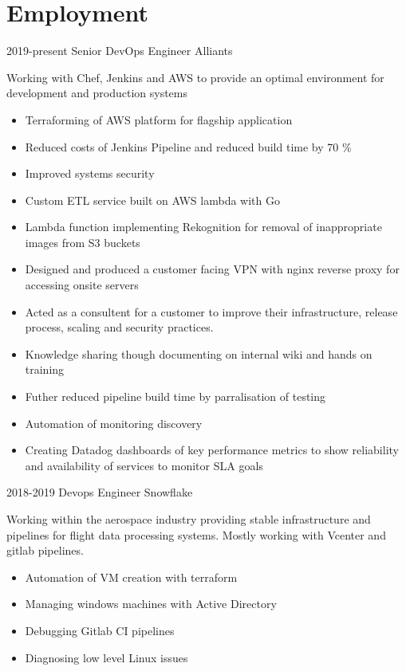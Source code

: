\documentclass[]{friggeri-cv-a4}
\begin{document}
\section{Employment}
 \begin{entrylist}
  \entry
  	{2019-present}
  	{Senior DevOps Engineer}
  	{Alliants}
  	{Working with Chef, Jenkins and AWS to provide an optimal environment for development and production systems
      \begin{itemize}
        \item Terraforming of AWS platform for flagship application
        \item Reduced costs of Jenkins Pipeline and reduced build time by 70 \%
        \item Improved systems security
        \item Custom ETL service built on AWS lambda with Go
        \item Lambda function implementing Rekognition for removal of inappropriate images from S3 buckets
        \item Designed and produced a customer facing VPN with nginx reverse proxy for accessing onsite servers
        \item Acted as a consultent for a customer to improve their infrastructure, release process, scaling and security practices. 
        \item Knowledge sharing though documenting on internal wiki and hands on training
        \item Futher reduced pipeline build time by parralisation of testing
        \item Automation of monitoring discovery
        \item Creating Datadog dashboards of key performance metrics to show reliability and availability of services to monitor SLA goals
      \end{itemize}}
  \entry 
  	{2018-2019}
  	{Devops Engineer}
  	{Snowflake}
  	{
      Working within the aerospace industry providing stable infrastructure and pipelines for flight data processing systems. Mostly working with Vcenter and gitlab pipelines.
      \begin{itemize}
        \item Automation of VM creation with terraform
        \item Managing windows machines with Active Directory
        \item Debugging Gitlab CI pipelines
        \item Diagnosing low level Linux issues

\end{itemize}}
\end{entrylist}
\end{document}
